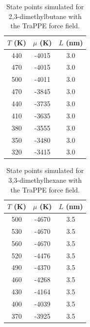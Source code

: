 \documentclass[journal=jctc,manuscript=article]{achemso}
\begin{document}
\begin{table}[htb!]
	\caption{State points simulated for 2,3-dimethylbutane with the TraPPE force field.}
	\begin{center}
		\begin{tabular}{|c|c|c|}
			\hline
			$T$ (K) & $\mu$ (K) & $L$ (nm) \\ \hline
			440	&	-4015	&	3.0	\\
			470	&	-4015	&	3.0	\\
			500	&	-4011	&	3.0	\\
			470	&	-3845	&	3.0	\\
			440	&	-3735	&	3.0	\\
			410	&	-3635	&	3.0	\\
			380	&	-3555	&	3.0	\\
			350	&	-3480	&	3.0	\\
			320	&	-3415	&	3.0	\\
			\hline
		\end{tabular}
	\end{center}
\end{table}

\begin{table}[htb!]
	\caption{State points simulated for 3,3-dimethylhexane with the TraPPE force field.}
	\begin{center}
		\begin{tabular}{|c|c|c|}
			\hline
			$T$ (K) & $\mu$ (K) & $L$ (nm) \\ \hline
			500	&	-4670	&	3.5	\\
			530	&	-4670	&	3.5	\\
			560	&	-4670	&	3.5	\\
			520	&	-4476	&	3.5	\\
			490	&	-4370	&	3.5	\\
			460	&	-4268	&	3.5	\\
			430	&	-4164	&	3.5	\\
			400	&	-4039	&	3.5	\\
			370	&	-3925	&	3.5	\\
			\hline
		\end{tabular}
	\end{center}
\end{table}
\end{document}
